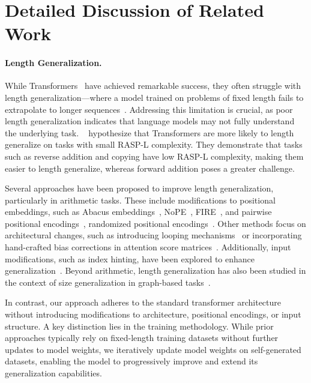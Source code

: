 \newpage
\section{Detailed Discussion of Related Work}\label{sec:related_work_extended}

\paragraph{Length Generalization.}
While Transformers~\citep{vaswani2017attention} have achieved remarkable success, they often struggle with length generalization—where a model trained on problems of fixed length fails to extrapolate to longer sequences~\citep{dubois2019location,hupkes2020compositionality,newman2020eos,anil2022exploring}. Addressing this limitation is crucial, as poor length generalization indicates that language models may not fully understand the underlying task. 
~\citet{zhou2023algorithms} hypothesize that Transformers are more likely to length generalize on tasks with small RASP-L complexity. They demonstrate that tasks such as reverse addition and copying have low RASP-L complexity, making them easier to length generalize, whereas forward addition poses a greater challenge. 

Several approaches have been proposed to improve length generalization, particularly in arithmetic tasks. These include modifications to positional embeddings, such as Abacus embeddings~\citep{mcleish2024transformers}, NoPE~\citep{kazemnejad2024impact}, FIRE~\citep{li2023functional}, and pairwise positional encodings~\citep{sabbaghi2024explicitly,Cho2024PositionCI}, randomized positional encodings~\citep{ruoss2023randomized,zhou2024transformers}. Other methods focus on architectural changes, such as introducing looping mechanisms~\citep{fan2024looped} or incorporating hand-crafted bias corrections in attention score matrices~\citep{duan2023interpolation}. Additionally, input modifications, such as index hinting, have been explored to enhance generalization~\citep{zhou2023algorithms,zhou2024transformers}. 
Beyond arithmetic, length generalization has also been studied in the context of size generalization in graph-based tasks~\citep{yehudai2021local}.

In contrast, our approach adheres to the standard transformer architecture without introducing modifications to architecture, positional encodings, or input structure. A key distinction lies in the training methodology. While prior approaches typically rely on fixed-length training datasets without further updates to model weights, we iteratively update model weights on self-generated datasets, enabling the model to progressively improve and extend its generalization capabilities.


